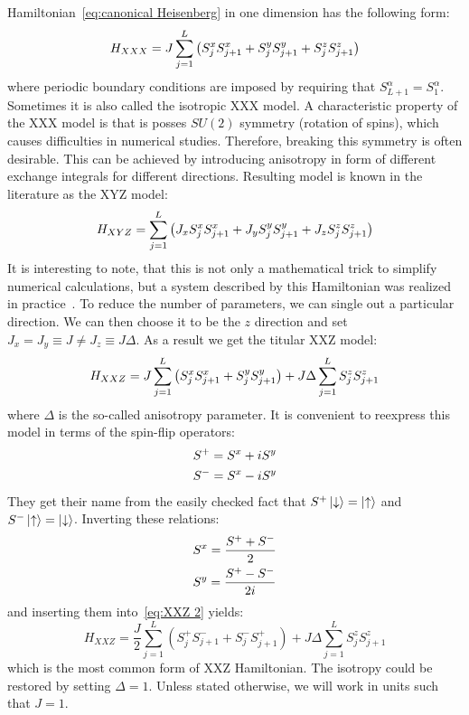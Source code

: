 Hamiltonian~\eqref{eq:canonical Heisenberg} in one dimension has the following form:
\begin{equation}
    H_{XXX} =  J\sum_{j=1}^L \left( S^{x}_{j}S^{x}_{j+1} + S^{y}_{j}S^{y}_{j+1} + S^{z}_{j}S^{z}_{j+1} \right)
    \label{eq:XXX}
\end{equation}
where periodic boundary conditions are imposed by requiring that \(S^{\alpha}_{L+1} = 
S^{\alpha}_{1}\). 
Sometimes it is also called the isotropic XXX model. A characteristic property of the XXX model
is that is posses \(SU(2)\) symmetry (rotation of spins), which causes
difficulties in numerical studies. Therefore, breaking this symmetry is often desirable.
This can be achieved by introducing anisotropy in form of different exchange integrals for
different directions. Resulting model is known in the literature as the XYZ model:
\begin{equation}
    H_{XYZ} = \sum_{j=1}^L  \left( J_{x} S^{x}_{j}S^{x}_{j+1} + J_{y} 
    S^{y}_{j}S^{y}_{j+1} + J_{z} S^{z}_{j}S^{z}_{j+1} \right)
\label{eq:XYZ}
\end{equation}
It is interesting to note, that this is not only a mathematical trick
to simplify numerical calculations, but a system described by this Hamiltonian was realized in
practice~\autocite{Pinheiro2013}.
To reduce the number of parameters, we can single out a particular direction.
We can then choose it to be the \(z\) direction
and set \(J_x = J_y \equiv J \neq J_z \equiv J\Delta\). As a result we get the titular XXZ model:
\begin{equation}
    H_{XXZ} = J\sum_{j=1}^L  \left( S^{x}_{j}S^{x}_{j+1} + S^{y}_{j}S^{y}_{j+1} \right) + 
    J\Delta \sum_{j=1}^L S^{z}_{j}S^{z}_{j+1}
\label{eq:XXZ 2}
\end{equation}
where \(\Delta\) is the so-called anisotropy parameter.
It is convenient to reexpress this model in terms of the spin-flip operators:
\begin{align}
    &S^{+} = S^{x} + iS^{y}\\
    &S^{-} = S^{x} - iS^{y}
\end{align}
They get their name from the easily checked fact that \(S^{+}\ket{\downarrow} = \ket{\uparrow}\) and 
\(S^{-}\ket{\uparrow} = \ket{\downarrow}\). Inverting these relations:
\begin{align}
    &S^{x} = \frac{S^{+} + S^{-}}{2}\\
    &S^{y} = \frac{S^{+} - S^{-}}{2i}
\end{align}
and inserting them into~\eqref{eq:XXZ 2} yields:
\begin{equation}
    H_{XXZ} = \frac{J}{2}\sum_{j = 1}^{L}\left( S^{+}_{j} S^{-}_{j+1} + 
    S^{-}_{j}S^{+}_{j+1} \right) + J\Delta\sum_{j = 1}^{L} S^{z}_{j}S^{z}_{j+1}
    \label{eq:XXZ}
\end{equation}
which is the most common form of XXZ Hamiltonian. The isotropy could be restored
by setting \(\Delta = 1\). Unless stated otherwise, we will work in units such that \(J = 1\).

